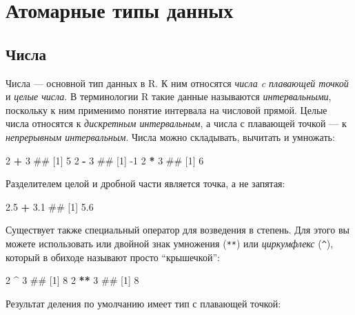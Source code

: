 \documentclass[]{book}
\newenvironment{Shaded}{\begin{snugshade}}{\end{snugshade}}
\newcommand{\DecValTok}[1]{\textcolor[rgb]{0.00,0.00,0.81}{#1}}
\newcommand{\FloatTok}[1]{\textcolor[rgb]{0.00,0.00,0.81}{#1}}
\newcommand{\StringTok}[1]{\textcolor[rgb]{0.31,0.60,0.02}{#1}}
\newcommand{\OperatorTok}[1]{\textcolor[rgb]{0.81,0.36,0.00}{\textbf{#1}}}
\newcommand{\NormalTok}[1]{#1}
\begin{document}
\chapter{Атомарные типы данных}\label{data_types}

\section{Числа}\label{numbers}

Числа --- основной тип данных в R. К ним относятся \emph{числа c
плавающей точкой} и \emph{целые числа}. В терминологии R такие данные
называются \emph{интервальными}, поскольку к ним применимо понятие
интервала на числовой прямой. Целые числа относятся к \emph{дискретным
интервальным}, а числа с плавающей точкой --- к \emph{непрерывным
интервальным}. Числа можно складывать, вычитать и умножать:

\begin{Shaded}
\begin{Highlighting}[]
\DecValTok{2} \OperatorTok{+}\StringTok{ }\DecValTok{3}
\NormalTok{## [1] 5}
\DecValTok{2} \OperatorTok{-}\StringTok{ }\DecValTok{3}
\NormalTok{## [1] -1}
\DecValTok{2} \OperatorTok{*}\StringTok{ }\DecValTok{3}
\NormalTok{## [1] 6}
\end{Highlighting}
\end{Shaded}

Разделителем целой и дробной части является точка, а не запятая:

\begin{Shaded}
\begin{Highlighting}[]
\FloatTok{2.5} \OperatorTok{+}\StringTok{ }\FloatTok{3.1}
\NormalTok{## [1] 5.6}
\end{Highlighting}
\end{Shaded}

Существует также специальный оператор для возведения в степень. Для
этого вы можете использовать или двойной знак умножения (\texttt{**})
или \emph{циркумфлекс} (\texttt{\^{}}), который в обиходе называют
просто ``крышечкой'':

\begin{Shaded}
\begin{Highlighting}[]
\DecValTok{2} \OperatorTok{^}\StringTok{ }\DecValTok{3}
\NormalTok{## [1] 8}
\DecValTok{2} \OperatorTok{**}\StringTok{ }\DecValTok{3}
\NormalTok{## [1] 8}
\end{Highlighting}
\end{Shaded}

Результат деления по умолчанию имеет тип с плавающей точкой:
\end{document}
